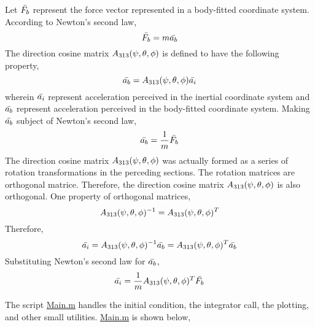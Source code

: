 \documentclass[class=report, 12pt, crop=false]{standalone}
\begin{document}
\begin{center}
Let $\bar{F_b}$ represent the force vector represented in a body-fitted coordinate system. According to Newton's second law,
$$\bar{F_b} = m\bar{a_b}$$
The direction cosine matrix $A_{313}(\psi,\theta,\phi)$ is defined to have the following property,
$$\bar{a_b} = A_{313}(\psi,\theta,\phi) \bar{a_i}$$
wherein $\bar{a_i}$ represent acceleration perceived in the inertial coordinate system and $\bar{a_b}$ represent acceleration perceived in the body-fitted coordinate system. Making $\bar{a_b}$ subject of Newton's second law,
$$\bar{a_b} = \frac{1}{m}\bar{F_b}$$
The direction cosine matrix $A_{313}(\psi,\theta,\phi)$ was actually formed as a series of rotation transformations in the perceding sections. The rotation matrices are orthogonal matrice. Therefore, the direction cosine matrix $A_{313}(\psi,\theta,\phi)$ is also orthogonal. One property of orthogonal matrices,
$$A_{313}(\psi,\theta,\phi)^{-1} = A_{313}(\psi,\theta,\phi)^T$$
Therefore, 
$$\bar{a_i} = A_{313}(\psi,\theta,\phi)^{-1}\bar{a_b} = A_{313}(\psi,\theta,\phi)^T\bar{a_b}$$
Substituting Newton's second law for $\bar{a_b}$,
$$\bar{a_i} = \frac{1}{m}A_{313}(\psi,\theta,\phi)^T\bar{F_b}$$

The script \url{Main.m} handles the initial condition, the integrator call, the plotting, and other small utilities. \url{Main.m} is shown below,













\end{center}
\end{document}

